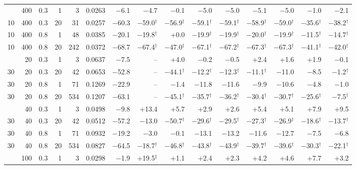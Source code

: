 \begin{tabular}{@{}rrrrr rrrrrrrrrr@{}}
\addlinespace[1pt]
10 & 400 & 0.3 & 1 & 3 & 0.0263 & $-$6.1 & $-$4.7 & $-$0.1 & $-$5.0 & $-$5.0 & $-$5.1 & $-$5.0 & $-$1.0 & $-$2.1 \\
10 & 400 & 0.3 & 20 & 31 & 0.0257 & $-$60.3 & $-$59.0$^{\dagger}$ & $-$56.9$^{\dagger}$ & $-$59.1$^{\dagger}$ & $-$59.1$^{\dagger}$ & $-$58.9$^{\dagger}$ & $-$59.0$^{\dagger}$ & $-$35.6$^{\dagger}$ & $-$38.2$^{\dagger}$ \\
10 & 400 & 0.8 & 1 & 48 & 0.0385 & $-$20.1 & $-$19.8$^{\dagger}$ & +0.0 & $-$19.9$^{\dagger}$ & $-$19.9$^{\dagger}$ & $-$20.0$^{\dagger}$ & $-$19.9$^{\dagger}$ & $-$11.5$^{\dagger}$ & $-$14.7$^{\dagger}$ \\
10 & 400 & 0.8 & 20 & 242 & 0.0372 & $-$68.7 & $-$67.4$^{\dagger}$ & $-$47.0$^{\dagger}$ & $-$67.1$^{\dagger}$ & $-$67.2$^{\dagger}$ & $-$67.3$^{\dagger}$ & $-$67.3$^{\dagger}$ & $-$41.1$^{\dagger}$ & $-$42.0$^{\dagger}$ \\
\addlinespace[1pt]
30 & 20 & 0.3 & 1 & 3 & 0.0637 & $-$7.5 & -- & +4.0 & $-$0.2 & $-$0.5 & +2.4 & +1.6 & +1.9 & $-$0.1 \\
30 & 20 & 0.3 & 20 & 42 & 0.0653 & $-$52.8 & -- & $-$44.1$^{\dagger}$ & $-$12.2$^{\dagger}$ & $-$12.3$^{\dagger}$ & $-$11.1$^{\dagger}$ & $-$11.0 & $-$8.5 & $-$1.2$^{\dagger}$ \\
30 & 20 & 0.8 & 1 & 71 & 0.1269 & $-$22.9 & -- & $-$1.4 & $-$11.8 & $-$11.6 & $-$9.9 & $-$10.6 & $-$4.8 & $-$1.0 \\
30 & 20 & 0.8 & 20 & 534 & 0.1207 & $-$63.1 & -- & $-$45.1$^{\dagger}$ & $-$35.7$^{\dagger}$ & $-$36.2$^{\dagger}$ & $-$30.4$^{\dagger}$ & $-$30.7$^{\dagger}$ & $-$25.6$^{\dagger}$ & $-$7.5$^{\dagger}$ \\
\addlinespace[1pt]
30 & 40 & 0.3 & 1 & 3 & 0.0498 & $-$9.8 & +13.4 & +5.7 & +2.9 & +2.6 & +5.4 & +5.1 & +7.9 & +9.5 \\
30 & 40 & 0.3 & 20 & 42 & 0.0512 & $-$57.2 & $-$13.0 & $-$50.7$^{\dagger}$ & $-$29.6$^{\dagger}$ & $-$29.5$^{\dagger}$ & $-$27.3$^{\dagger}$ & $-$26.9$^{\dagger}$ & $-$18.6$^{\dagger}$ & $-$13.7$^{\dagger}$ \\
30 & 40 & 0.8 & 1 & 71 & 0.0932 & $-$19.2 & $-$3.0 & $-$0.1 & $-$13.1 & $-$13.2 & $-$11.6 & $-$12.7 & $-$7.5 & $-$6.8 \\
30 & 40 & 0.8 & 20 & 534 & 0.0827 & $-$64.5 & $-$18.7$^{\dagger}$ & $-$46.8$^{\dagger}$ & $-$43.8$^{\dagger}$ & $-$43.9$^{\dagger}$ & $-$39.7$^{\dagger}$ & $-$39.6$^{\dagger}$ & $-$30.3$^{\dagger}$ & $-$22.1$^{\dagger}$ \\
\addlinespace[1pt]
30 & 100 & 0.3 & 1 & 3 & 0.0298 & $-$1.9 & +19.5$^{\ddagger}$ & +1.1 & +2.4 & +2.3 & +4.2 & +4.6 & +7.7 & +3.2 \\

\end{tabular}
